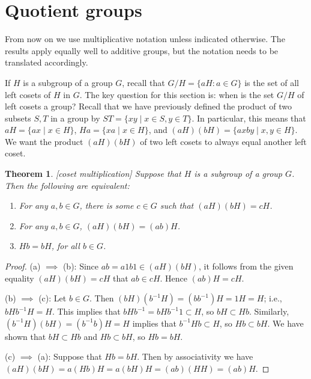 \documentclass[11pt]{article}
\newtheorem{thm}{Theorem}[section]
\theoremstyle{definition}
\begin{document}
\setcounter{section}{20}



\section{Quotient groups}\noindent
From now on we use multiplicative notation unless indicated
otherwise. The results apply equally well to additive groups, but the
notation needs to be translated accordingly.


If $H$ is a subgroup of a group $G$, recall that $G/H =\{aH : a \in G
\}$ is the set of all left cosets of $H$ in $G$. The key question for
this section is: when is the set $G/H$ of left cosets a group?  Recall
that we have previously defined the product of two subsets $S,T$ in a
group by $ST = \{xy \mid x \in S, y \in T \}$. In particular, this
means that $aH = \{ax \mid x \in H \}$, $Ha = \{ xa \mid x \in H \}$,
and $(aH)(bH) = \{ axby \mid x,y \in H\}$.  We want the product
$(aH)(bH)$ of two left cosets to always equal another left coset.

\begin{thm}\label{thm:coset-mult}[coset multiplication]
  Suppose that $H$ is a subgroup of a group $G$. Then the following
  are equivalent: 
  \begin{enumerate}
  \item For any $a,b \in G$, there is some $c \in G$ such that
    $(aH)(bH) = cH$.
  \item For any $a,b \in G$, $(aH)(bH)=(ab)H$. 
  \item $Hb = bH$, for all $b \in G$.
  \end{enumerate}
\end{thm}

\begin{proof}
(a) $\implies$ (b): Since $ab = a1b1 \in (aH)(bH)$, it follows from
  the given equality $(aH)(bH) = cH$ that $ab \in cH$. Hence $(ab)H =
  cH$.

(b) $\implies$ (c): Let $b \in G$. Then $(bH)(b^{-1}H) = (bb^{-1})H =
  1H = H$; i.e., $bHb^{-1}H = H$. This implies that $b H b^{-1} =
  bHb^{-1} 1 \subset H$, so $bH \subset Hb$. Similarly, $(b^{-1}H)(bH)
  = (b^{-1}b)H = H$ implies that $b^{-1}Hb \subset H$, so $Hb \subset
  bH$. We have shown that $bH \subset Hb$ and $Hb \subset bH$, so $Hb
  = bH$.

(c) $\implies$ (a): Suppose that $Hb = bH$. Then by associativity we
  have $(aH)(bH) = a(Hb)H = a(bH)H = (ab)(HH) = (ab)H$.
\end{proof}
\end{document}
